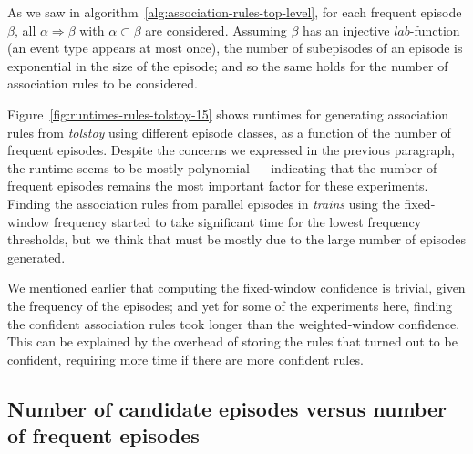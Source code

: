 As we saw in algorithm~\ref{alg:association-rules-top-level}, for each frequent episode $ \beta $, all $ \alpha \Rightarrow \beta $ with $ \alpha \subset \beta $ are considered. Assuming $ \beta $ has an injective $ lab $-function (an event type appears at most once), the number of subepisodes of an episode is exponential in the size of the episode; and so the same holds for the number of association rules to be considered.

Figure~\ref{fig:runtimes-rules-tolstoy-15} shows runtimes for generating association rules from \emph{tolstoy} using different episode classes, as a function of the number of frequent episodes. Despite the concerns we expressed in the previous paragraph, the runtime seems to be mostly polynomial --- indicating that the number of frequent episodes remains the most important factor for these experiments. Finding the association rules from parallel episodes in \emph{trains} using the fixed-window frequency started to take significant time for the lowest frequency thresholds, but we think that must be mostly due to the large number of episodes generated.

We mentioned earlier that computing the fixed-window confidence is trivial, given the frequency of the episodes; and yet for some of the experiments here, finding the confident association rules took longer than the weighted-window confidence. This can be explained by the overhead of storing the rules that turned out to be confident, requiring more time if there are  more confident rules.

\iffalse
\subsection{Number of candidate episodes versus number of frequent episodes}


